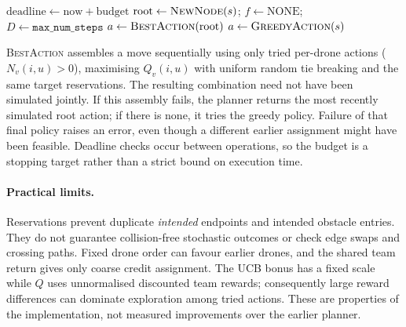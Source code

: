 \documentclass[11pt,a4paper]{article}
\begin{document}
\begin{algorithm}[H]
\small
\caption{\textsc{Plan}$(s,\mathrm{budget})$}
\label{alg:plan}
$\mathrm{deadline}\leftarrow\mathrm{now}+\mathrm{budget}$\;
$\mathrm{root}\leftarrow\textsc{NewNode}(s)$; $f\leftarrow\mathrm{NONE}$; $D\leftarrow\texttt{max\_num\_steps}$\;
$a\leftarrow\textsc{BestAction}(\mathrm{root})$\;
$a\leftarrow\textsc{GreedyAction}(s)$\;
\;
\end{algorithm}

\textsc{BestAction} assembles a move sequentially using only tried per-drone actions ($N_v(i,u)>0$), maximising $Q_v(i,u)$ with uniform random tie breaking and the same target reservations. The resulting combination need not have been simulated jointly. If this assembly fails, the planner returns the most recently simulated root action; if there is none, it tries the greedy policy. Failure of that final policy raises an error, even though a different earlier assignment might have been feasible. Deadline checks occur between operations, so the budget is a stopping target rather than a strict bound on execution time.

\paragraph{Practical limits.}
Reservations prevent duplicate \emph{intended} endpoints and intended obstacle entries. They do not guarantee collision-free stochastic outcomes or check edge swaps and crossing paths. Fixed drone order can favour earlier drones, and the shared team return gives only coarse credit assignment. The UCB bonus has a fixed scale while $Q$ uses unnormalised discounted team rewards; consequently large reward differences can dominate exploration among tried actions. These are properties of the implementation, not measured improvements over the earlier planner.
\end{document}
